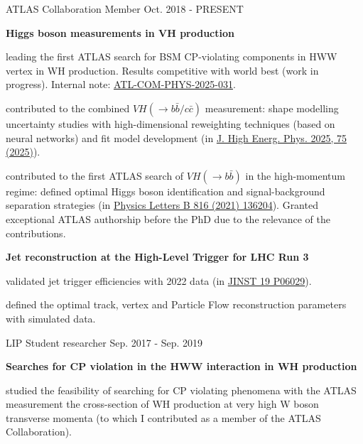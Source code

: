 \begin{cventries}
    \cventry
    {ATLAS Collaboration}
    {Member}
    {}
    {Oct. 2018 - PRESENT}
    {
        \textbf{Higgs boson measurements in VH production}\vspace{14pt}
        \begin{cvitems}
            \item {leading the first ATLAS search for BSM CP-violating components in HWW vertex in WH production. Results competitive with world best (work in progress). Internal note: \href{https://cds.cern.ch/record/2921718}{ATL-COM-PHYS-2025-031}.}
            \item {contributed to the combined $VH(\to b\bar{b}/c\bar{c})$ measurement: shape modelling uncertainty studies with high-dimensional reweighting techniques (based on neural networks) and fit model development (in \href{https://doi.org/10.1007/JHEP04(2025)075}{J. High Energ. Phys. 2025, 75 (2025)}).}
            \item {contributed to the first ATLAS search of $VH(\to b\bar{b})$ in the high-momentum regime: defined optimal Higgs boson identification and signal-background separation strategies (in \href{https://doi.org/10.1016/j.physletb.2021.136204}{Physics Letters B 816 (2021) 136204}). Granted exceptional ATLAS authorship before the PhD due to the relevance of the contributions.}
        \end{cvitems}\vspace{19pt}
        \textbf{Jet reconstruction at the High-Level Trigger for LHC Run 3}\vspace{14pt}
        \begin{cvitems}
            \item {validated jet trigger efficiencies with 2022 data (in \href{https://doi.org/10.1088/1748-0221/19/06/P06029}{JINST 19 P06029}).}
            \item {defined the optimal track, vertex and Particle Flow reconstruction parameters with simulated data.}
        \end{cvitems}
    }

    \cventry
    {LIP}
    {Student researcher}
    {}
    {Sep. 2017 - Sep. 2019}
    {
        \textbf{Searches for CP violation in the HWW interaction in WH production}\vspace{12pt}
        \begin{cvitems}      
            \item {studied the feasibility of searching for CP violating phenomena with the ATLAS measurement the cross-section of WH production at very high W boson transverse momenta (to which I contributed as a member of the ATLAS Collaboration).}
        \end{cvitems}
    }

\end{cventries}
